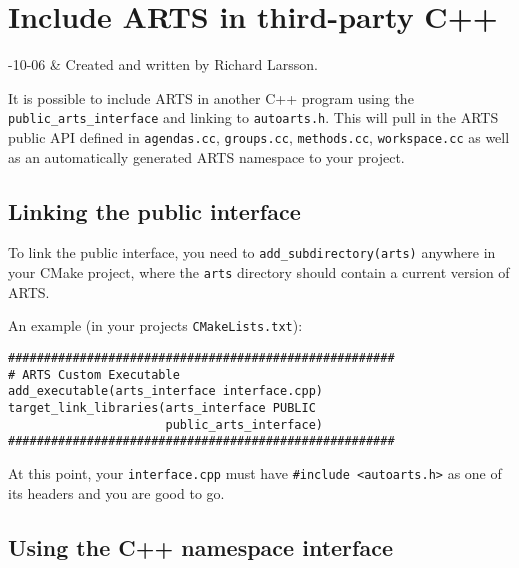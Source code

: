 \chapter{Include ARTS in third-party C++}
\label{sec:cpp_api}

-10-06 & Created and written by Richard Larsson.\\
\stophistory

%
%

It is possible to include ARTS in another C++ program using
the \verb|public_arts_interface| and linking to \verb|autoarts.h|.
This will pull in the ARTS public API defined in \verb|agendas.cc|,
\verb|groups.cc|, \verb|methods.cc|, \verb|workspace.cc| as well
as an automatically generated ARTS namespace to your project.


\section{Linking the public interface}
\label{sec:cpp_api:public_linking}

To link the public interface, you need to \verb|add_subdirectory(arts)|
anywhere in your CMake project, where the \verb|arts| directory should contain
a current version of ARTS.

An example (in your projects \verb|CMakeLists.txt|):
\begin{verbatim}
######################################################
# ARTS Custom Executable
add_executable(arts_interface interface.cpp)
target_link_libraries(arts_interface PUBLIC
                      public_arts_interface)
######################################################
\end{verbatim}

At this point, your \verb|interface.cpp| must have
\verb|#include <autoarts.h>| as one of its headers
and you are good to go.

\section{Using the C++ namespace interface}
\label{sec:cpp_api:usage}

